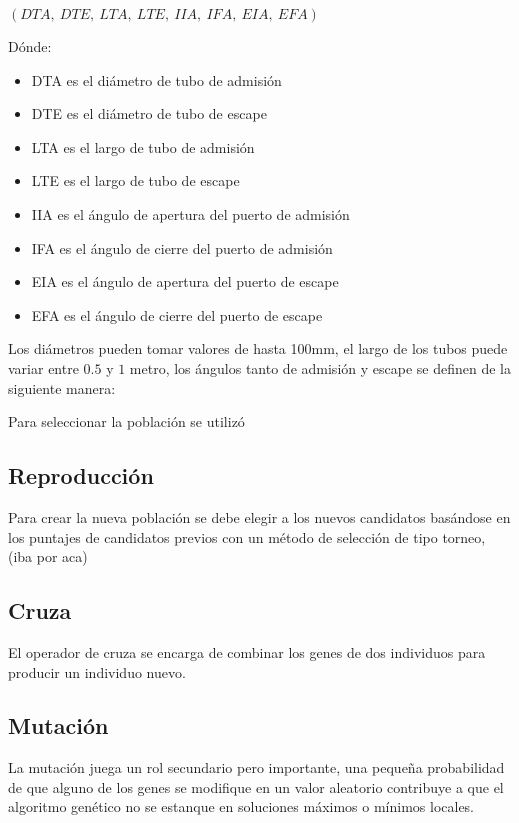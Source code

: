 \centerline{$(DTA,\ DTE,\ LTA,\ LTE,\ IIA,\ IFA,\ EIA,\ EFA)$}
%
Dónde:
%
\begin{itemize}
    \item DTA es el diámetro de tubo de admisión
    \item DTE es el diámetro de tubo de escape
    \item LTA es el largo de tubo de admisión
    \item LTE es el largo de tubo de escape
    \item IIA es el ángulo de apertura del puerto de admisión
    \item IFA es el ángulo de cierre del puerto de admisión
    \item EIA es el ángulo de apertura del puerto de escape
    \item EFA es el ángulo de cierre del puerto de escape
\end{itemize}

Los diámetros pueden tomar valores de hasta 100mm, el largo de los
tubos puede variar entre $0.5$ y $1$ metro, los ángulos tanto de
admisión y escape se definen de la siguiente manera:



Para seleccionar la población se utilizó 


\subsection{Reproducción}

Para crear la nueva población se debe elegir a los nuevos candidatos basándose
en los puntajes de candidatos previos con un método de selección de tipo
torneo, (iba por aca)

\subsection{Cruza}
%
El operador de cruza se encarga de combinar los genes de dos individuos para
producir un individuo nuevo.

\subsection{Mutación}
%
La mutación juega un rol secundario pero importante, una pequeña probabilidad
de que alguno de los genes se modifique en un valor aleatorio contribuye a que
el algoritmo genético no se estanque en soluciones máximos o mínimos locales.

